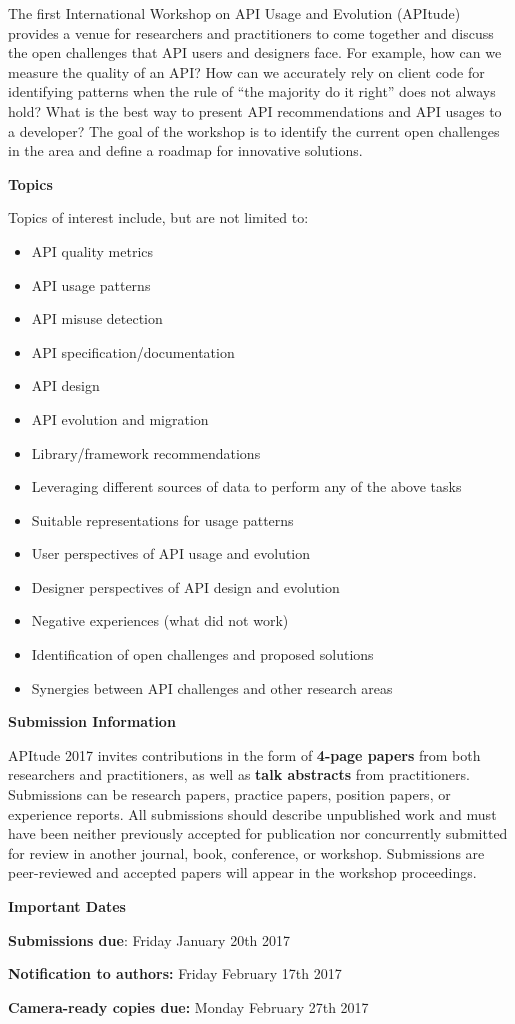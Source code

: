 \documentclass[10pt, conference]{IEEEtran}
\begin{document}
The first International Workshop on API Usage and Evolution (APItude) provides a venue for researchers and practitioners to come together and discuss the open challenges that API users and designers face. For example, how can we measure the quality of an API? How can we accurately rely on client code for identifying patterns when the rule of ``the majority do it right'' does not always hold? What is the best way to present API recommendations and API usages to a developer? The goal of the workshop is to identify the current open challenges in the area and define a roadmap for innovative solutions.


\vspace{0.2cm}

\noindent
\textbf{\large Topics}
\vspace{0.2cm}

Topics of interest include, but are not limited to:
\begin{itemize}
\setlength\itemsep{5pt}
\item API quality metrics
\item API usage patterns
\item API misuse detection
\item API specification/documentation
\item API design
\item API evolution and migration
\item Library/framework recommendations
\item Leveraging different sources of data to perform any of the above tasks
\item Suitable representations for usage patterns
\item User perspectives of API usage and evolution
\item Designer perspectives of API design and evolution
\item Negative experiences (what did not work)
\item Identification of open challenges and proposed solutions
\item Synergies between API challenges and other research areas  
\end{itemize}


\vspace{0.2cm}
\noindent
\textbf{\large Submission Information}
\vspace{0.2cm}

APItude 2017 invites contributions in the form of \textbf{4-page papers} from both researchers and practitioners, as well as \textbf{talk abstracts} from practitioners. Submissions can be research papers, practice papers, position papers, or experience reports. All submissions should describe unpublished work and must have been neither previously accepted for publication nor concurrently submitted for review in another journal, book, conference, or workshop. Submissions are peer-reviewed and accepted papers will appear in the workshop proceedings.

\vspace{0.2cm}
\noindent
\textbf{\large Important Dates}
\vspace{0.2cm}

\textbf{Submissions due}: Friday January 20th 2017

\textbf{Notification to authors:} Friday February 17th 2017

\textbf{Camera-ready copies due:} Monday February 27th 2017
\end{document}
